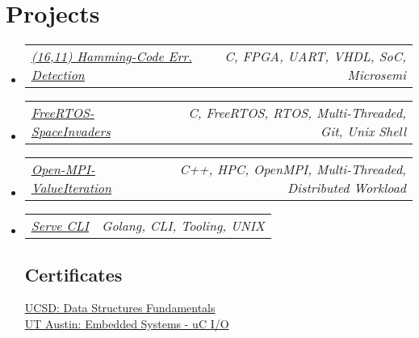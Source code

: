\documentclass[letterpaper,11pt]{article}
\makeatletter
\newcommand{\resumeItem}[1]{
  \item\small{
    {#1 \vspace{-2pt}}
  }
}
\newcommand{\resumeProjectHeading}[2]{
    \item
    \begin{tabular*}{0.97\textwidth}{l@{\extracolsep{\fill}}r}
      \small#1 & #2 \\
    \end{tabular*}\vspace{-7pt}
}
\newcommand{\resumeSubHeadingListStart}{\begin{itemize}[leftmargin=0.15in, label={}]}
\newcommand{\resumeSubHeadingListEnd}{\end{itemize}}
\newcommand{\resumeItemListStart}{\begin{itemize}}
\newcommand{\resumeItemListEnd}{\end{itemize}\vspace{-5pt}}
\makeatother
\begin{document}
\section{Projects}
    \resumeSubHeadingListStart
        \resumeProjectHeading
        { \href{https://github.com/duclos-cavalcanti/microsemi-error-detection}{\underline{\textit{(16,11) Hamming-Code Err. Detection}} } }{\footnotesize\emph{C, FPGA, UART, VHDL, SoC, Microsemi}}
        \vspace{-9.0pt}
        \resumeProjectHeading
        { \href{https://github.com/duclos-cavalcanti/FreeRTOS-SpaceInvaders}{\underline{\textit{FreeRTOS-SpaceInvaders}}} }{\footnotesize\emph{C, FreeRTOS, RTOS, Multi-Threaded, Git, Unix Shell}}
        \vspace{-9.0pt}
        \resumeProjectHeading
        { \href{https://github.com/duclos-cavalcanti/Open-MPI-ValueIteration}{\underline{\textit{Open-MPI-ValueIteration}}} }{\footnotesize\emph{C++, HPC, OpenMPI, Multi-Threaded, Distributed Workload}}
        \vspace{-9.0pt}
        \resumeProjectHeading
        { \href{https://github.com/duclos-cavalcanti/serve}{\underline{\textit{Serve CLI}}} }{\footnotesize\emph{Golang, CLI, Tooling, UNIX}}

        \subsection{Certificates}
         \href{https://courses.edx.org/certificates/f9250573933e4a3e87e8b28ea989bf99}{{UCSD: Data Structures Fundamentals}} \\
         \href{https://courses.edx.org/certificates/af6115bce0c646aa95f6aaa6c98acb09}{{UT Austin: Embedded Systems - uC I/O}}

    \resumeSubHeadingListEnd
    
\end{document}
